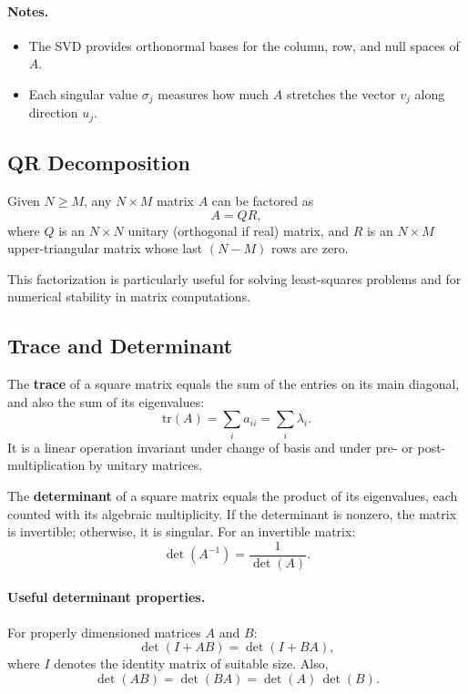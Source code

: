 \paragraph{Notes.}
\begin{itemize}
  \item The SVD provides orthonormal bases for the column, row, and null spaces of \(A\).
  \item Each singular value \(\sigma_j\) measures how much \(A\) stretches the vector \(v_j\) along direction \(u_j\).
\end{itemize}

\subsection{QR Decomposition}

Given \( N \ge M \), any \( N \times M \) matrix \( A \) can be factored as
\[
A = Q R, \tag{B.21}
\]
where \( Q \) is an \( N \times N \) unitary (orthogonal if real) matrix, and \( R \) is an \( N \times M \) upper-triangular matrix whose last \( (N - M) \) rows are zero.

This factorization is particularly useful for solving least-squares problems and for numerical stability in matrix computations.


\subsection{Trace and Determinant}

The \textbf{trace} of a square matrix equals the sum of the entries on its main diagonal, and also the sum of its eigenvalues:
\[
\mathrm{tr}(A) = \sum_i a_{ii} = \sum_i \lambda_i.
\]
It is a linear operation invariant under change of basis and under pre- or post-multiplication by unitary matrices.

The \textbf{determinant} of a square matrix equals the product of its eigenvalues, each counted with its algebraic multiplicity.  
If the determinant is nonzero, the matrix is invertible; otherwise, it is singular.  
For an invertible matrix:
\[
\det(A^{-1}) = \frac{1}{\det(A)}.\tag{B.22}
\]

\paragraph{Useful determinant properties.}
For properly dimensioned matrices \(A\) and \(B\):
\[
\det(I + AB) = \det(I + BA),\tag{B.23}
\]
where \(I\) denotes the identity matrix of suitable size.  
Also,
\[
\det(AB) = \det(BA) = \det(A)\,\det(B).\tag{B.24, B.25}
\]

